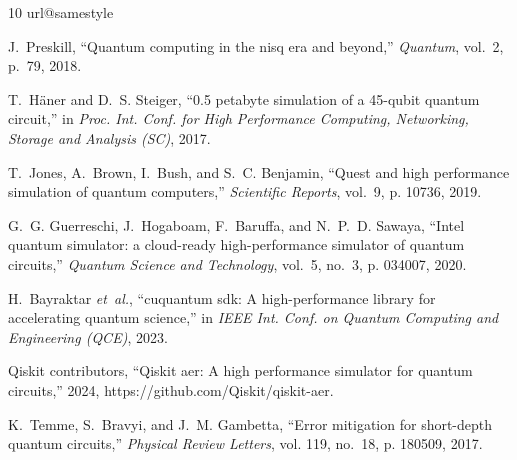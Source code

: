\documentclass{ieeeaccess}
\begin{document}
\begin{thebibliography}{10}
\providecommand{\url}[1]{#1}
\csname url@samestyle\endcsname
\providecommand{\newblock}{\relax}
\providecommand{\bibinfo}[2]{#2}
\providecommand{\BIBentrySTDinterwordspacing}{\spaceskip=0pt\relax}
\providecommand{\BIBentryALTinterwordstretchfactor}{4}
\providecommand{\BIBentryALTinterwordspacing}{\spaceskip=\fontdimen2\font plus
\BIBentryALTinterwordstretchfactor\fontdimen3\font minus
  \fontdimen4\font\relax}
\providecommand{\BIBforeignlanguage}[2]{{%
\expandafter\ifx\csname l@#1\endcsname\relax
\typeout{** WARNING: IEEEtran.bst: No hyphenation pattern has been}%
\typeout{** loaded for the language `#1'. Using the pattern for}%
\typeout{** the default language instead.}%
\else
\language=\csname l@#1\endcsname
\fi
#2}}
\providecommand{\BIBdecl}{\relax}
\BIBdecl

J.~Preskill, ``Quantum computing in the nisq era and beyond,'' \emph{Quantum},
  vol.~2, p.~79, 2018.

T.~H{\"a}ner and D.~S. Steiger, ``0.5 petabyte simulation of a 45-qubit quantum
  circuit,'' in \emph{Proc. Int. Conf. for High Performance Computing,
  Networking, Storage and Analysis (SC)}, 2017.

T.~Jones, A.~Brown, I.~Bush, and S.~C. Benjamin, ``Quest and high performance
  simulation of quantum computers,'' \emph{Scientific Reports}, vol.~9, p.
  10736, 2019.

G.~G. Guerreschi, J.~Hogaboam, F.~Baruffa, and N.~P.~D. Sawaya, ``Intel quantum
  simulator: a cloud-ready high-performance simulator of quantum circuits,''
  \emph{Quantum Science and Technology}, vol.~5, no.~3, p. 034007, 2020.

H.~Bayraktar \emph{et~al.}, ``cuquantum sdk: A high-performance library for
  accelerating quantum science,'' in \emph{IEEE Int. Conf. on Quantum Computing
  and Engineering (QCE)}, 2023.

{Qiskit contributors}, ``Qiskit aer: A high performance simulator for quantum
  circuits,'' 2024, https://github.com/Qiskit/qiskit-aer.

K.~Temme, S.~Bravyi, and J.~M. Gambetta, ``Error mitigation for short-depth
  quantum circuits,'' \emph{Physical Review Letters}, vol. 119, no.~18, p.
  180509, 2017.


\end{thebibliography}
\end{document}
